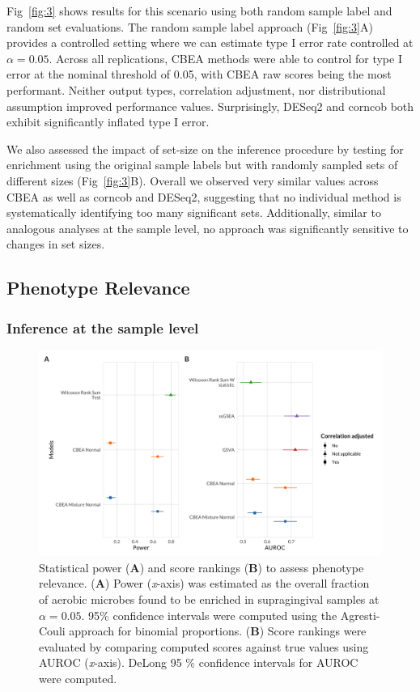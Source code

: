 \documentclass[10pt,letterpaper]{article}
\begin{document}
Fig~\ref{fig:3} shows results for this scenario using both random sample label and random set evaluations. The random sample label approach (Fig~\ref{fig:3}A) provides a controlled setting where we can estimate type I error rate controlled at $\alpha = 0.05$. Across all replications, CBEA methods were able to control for type I error at the nominal threshold of 0.05, with CBEA raw scores being the most performant. Neither output types, correlation adjustment, nor distributional assumption improved performance values. Surprisingly, DESeq2 and corncob both exhibit significantly inflated type I error. 

We also assessed the impact of set-size on the inference procedure by testing for enrichment using the original sample labels but with randomly sampled sets of different sizes (Fig~\ref{fig:3}B). Overall we observed very similar values across CBEA as well as corncob and DESeq2, suggesting that no individual method is systematically identifying too many significant sets. Additionally, similar to analogous analyses at the sample level, no approach was significantly sensitive to changes in set sizes.  

\subsection*{Phenotype Relevance} 
\subsubsection*{Inference at the sample level}
\begin{figure}[!h]
    \centering
    \includegraphics[width = \textwidth]{figures/data_ss_pwr_new.png}
    \caption{Statistical power (\textbf{A}) and score rankings (\textbf{B}) to assess phenotype relevance. (\textbf{A}) Power (\emph{x}-axis) was estimated as the overall fraction of aerobic microbes found to be enriched in supragingival samples at $\alpha = 0.05$. 95\% confidence intervals were computed using the Agresti-Couli approach for binomial proportions. (\textbf{B}) Score rankings were evaluated by comparing computed scores against true values using AUROC (\emph{x}-axis). DeLong 95 \% confidence intervals for AUROC were computed.} 
    \label{fig:4}
\end{figure}
\end{document}
